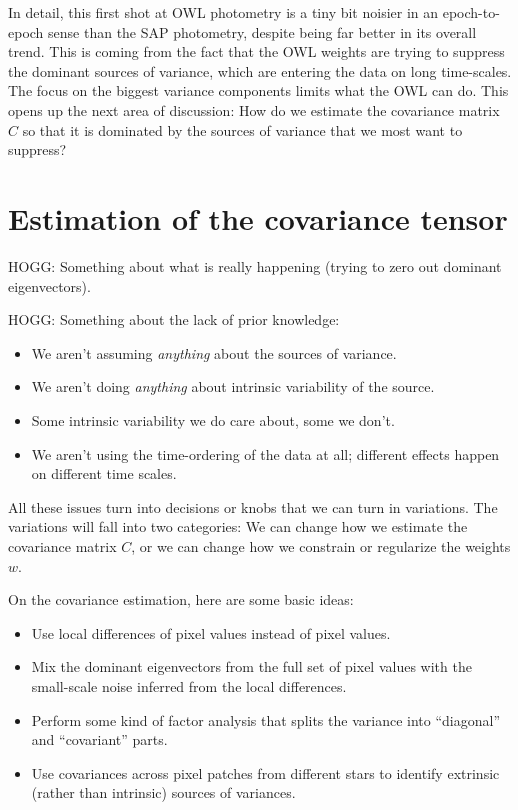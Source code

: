 \documentclass[12pt, letterpaper, preprint]{aastex}
\begin{document}
In detail, this first shot at OWL photometry is a tiny bit noisier
  in an epoch-to-epoch sense
  than the SAP photometry,
  despite being far better in its overall trend.
This is coming from the fact that the OWL weights are trying to suppress the dominant
  sources of variance,
  which are entering the data on long time-scales.
The focus on the biggest variance components limits what the OWL can do.
This opens up the next area of discussion:
How do we estimate the covariance matrix $\hat{C}$ so that it is dominated by the sources of variance
  that we most want to suppress?

\section{Estimation of the covariance tensor}

HOGG:
Something about what is really happening (trying to zero out dominant eigenvectors).

HOGG:
Something about the lack of prior knowledge:
\begin{itemize}
\item
We aren't assuming \emph{anything} about the sources of variance.
\item
We aren't doing \emph{anything} about intrinsic variability of the source.
\item
Some intrinsic variability we do care about, some we don't.
\item
We aren't using the time-ordering of the data at all;
  different effects happen on different time scales.
\end{itemize}
All these issues turn into decisions or knobs that we can turn in variations.
The variations will fall into two categories:
We can change how we estimate the covariance matrix $C$,
  or we can change how we constrain or regularize the weights $w$.

On the covariance estimation, here are some basic ideas:
\begin{itemize}
\item
Use local differences of pixel values instead of pixel values.
\item
Mix the dominant eigenvectors from the full set of pixel values
  with the small-scale noise inferred from the local differences.
\item
Perform some kind of factor analysis that splits the variance into
  ``diagonal'' and ``covariant'' parts.
\item
Use covariances across pixel patches from different stars
  to identify extrinsic (rather than intrinsic)
  sources of variances.
\end{itemize}
\end{document}
